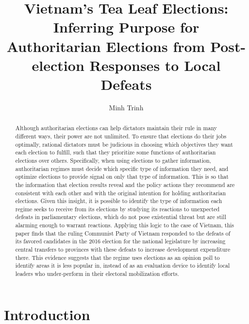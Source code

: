 \documentclass[12pt]{article}
\title{Vietnam's Tea Leaf Elections: \\
	Inferring Purpose for Authoritarian Elections from Post-election Responses to Local Defeats}
\author{Minh Trinh}
\newcommand{\1}{\mathbbm{1}}
\begin{document}
\maketitle

\begin{abstract}
Although authoritarian elections can help dictators maintain their rule in many different ways, their power are not unlimited. To ensure that elections do their jobs optimally, rational dictators must be judicious in choosing which objectives they want each election to fulfill, such that they prioritize some functions of authoritarian elections over others. Specifically, when using elections to gather information, authoritarian regimes must decide which specific type of information they need, and optimize elections to provide signal on only that type of information. This is so that the information that election results reveal and the policy actions they recommend are consistent with each other and with the original intention for holding authoritarian elections. Given this insight, it is possible to identify the type of information each regime seeks to receive from its elections by studying its reactions to unexpected defeats in parliamentary elections, which do not pose existential threat but are still alarming enough to warrant reactions. Applying this logic to the case of Vietnam, this paper finds that the ruling Communist Party of Vietnam responded to the defeats of its favored candidates in the 2016 election for the national legislature by increasing central transfers to provinces with these defeats to increase development expenditure there. This evidence suggests that the regime uses elections as an opinion poll to identify areas it is less popular in, instead of as an evaluation device to identify local leaders who under-perform in their electoral mobilization efforts.
\end{abstract}

\newpage
\doublespacing

\section{Introduction}
\end{document}
